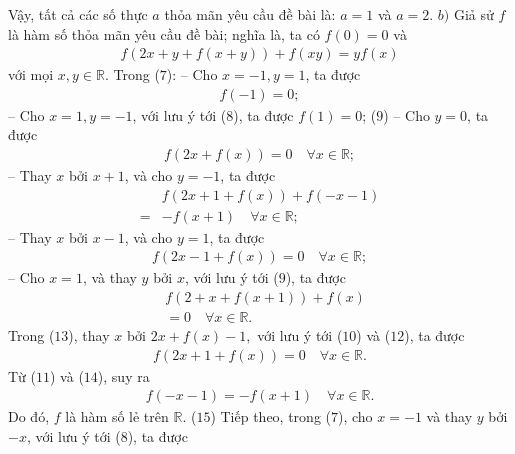 \begin{multicols}{2}
	\vskip 0.05cm
	Vậy, tất cả các số thực $a$ thỏa mãn yêu cầu đề bài là: $a = 1$ và $a = 2$.
	\vskip 0.05cm
	$b)$ Giả sử $f$ là hàm số thỏa mãn yêu cầu đề bài; nghĩa là, ta có $f(0) = 0$ và
	\begin{align*}
		f\left( {2x \!+\! y \!+\! f\left( {x \!+\! y} \right)} \right) \!+\! f\left( {xy} \right) \!=\! yf\left( x \right) \tag{$7$}
	\end{align*}
	với mọi $x,y \in \mathbb{R}$.
	\vskip 0.05cm
	Trong ($7$):
	\vskip 0.05cm
	-- Cho $x = -1, y = 1$, ta được
	\begin{align*}
		f(-1) = 0; \tag{$8$}
	\end{align*}
	-- Cho $x = 1, y = -1$, với lưu ý tới ($8$), ta được  $f(1) = 0 $; \hfill ($9$)
	\vskip 0.05cm
	-- Cho $y = 0$, ta được
	\begin{align*}
		f\left( {2x + f\left( x \right)} \right) = 0 \quad \forall x \in \mathbb{R}; \tag{$10$}
	\end{align*}
	-- Thay $x$ bởi $x + 1$, và cho $y = -1$, ta được
	\begin{align*}
		&f\left( {2x + 1 + f\left( x \right)} \right) + f\left( { - x - 1} \right)\\ 
		=  &- f\left( {x + 1} \right) \quad\forall x \in \mathbb{R}; \tag{$11$}
	\end{align*}
	-- Thay $x$ bởi $x - 1$, và cho $y = 1$, ta được
	\begin{align*}
		f\left( {2x - 1 + f\left( x \right)} \right) = 0 \quad\forall x \in \mathbb{R}; \tag{$12$}
	\end{align*}
	-- Cho $x = 1$, và thay $y$ bởi $x$, với lưu ý tới ($9$), ta được
	\begin{align*}
		&f\left( {2 + x + f\left( {x + 1} \right)} \right) + f\left( x \right) \\
		&= 0 \quad\forall x \in \mathbb{R}. \tag{$13$}
	\end{align*}
	Trong ($13$), thay $x$ bởi  $2x + f\left( x \right) - 1,$ với lưu ý tới ($10$) và ($12$), ta được
	\begin{align*}
		f\left( {2x + 1 + f\left( x \right)} \right) = 0 \quad
		\forall x \in \mathbb{R}. \tag{$14$}
	\end{align*}
	Từ ($11$) và ($14$), suy ra
	\begin{align*}
		f\left( { - x - 1} \right) =  - f\left( {x + 1} \right) \quad\forall x \in \mathbb{R}.
	\end{align*}
	Do đó, $f$ là hàm số lẻ trên $\mathbb{R}$. \hfill ($15$)
	\vskip 0.05cm
	Tiếp theo, trong ($7$), cho $x = -1$ và thay $y$ bởi $-x$, với lưu ý tới ($8$), ta được

\end{multicols}
